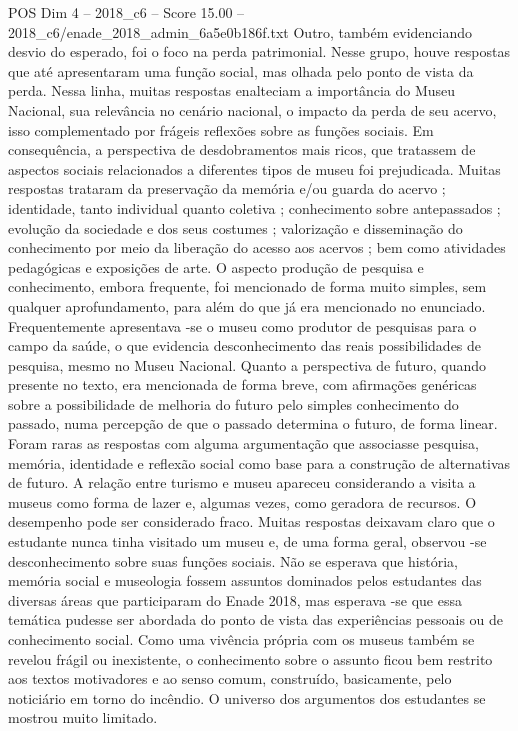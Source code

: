 \begin{textsample}{POS Dim 4 – 2018\_c6 – Score 15.00 – 2018\_c6/enade\_2018\_admin\_6a5e0b186f.txt}
Outro, também evidenciando desvio do esperado, foi o foco na perda patrimonial.
Nesse grupo, houve respostas que até apresentaram uma função social, mas olhada pelo ponto de vista da perda.
Nessa linha, muitas respostas enalteciam a importância do Museu Nacional, sua relevância no cenário nacional, o impacto da perda de seu acervo, isso complementado por frágeis reflexões sobre as funções sociais.
Em consequência, a perspectiva de desdobramentos mais ricos, que tratassem de aspectos sociais relacionados a diferentes tipos de museu foi prejudicada.
Muitas respostas trataram da preservação da memória e/ou guarda do acervo ; identidade, tanto individual quanto coletiva ; conhecimento sobre antepassados ; evolução da sociedade e dos seus costumes ; valorização e disseminação do conhecimento por meio da liberação do acesso aos acervos ; bem como atividades pedagógicas e exposições de arte.
O aspecto produção de pesquisa e conhecimento, embora frequente, foi mencionado de forma muito simples, sem qualquer aprofundamento, para além do que já era mencionado no enunciado.
Frequentemente apresentava -se o museu como produtor de pesquisas para o campo da saúde, o que evidencia desconhecimento das reais possibilidades de pesquisa, mesmo no Museu Nacional.
Quanto a perspectiva de futuro, quando presente no texto, era mencionada de forma breve, com afirmações genéricas sobre a possibilidade de melhoria do futuro pelo simples conhecimento do passado, numa percepção de que o passado determina o futuro, de forma linear.
Foram raras as respostas com alguma argumentação que associasse pesquisa, memória, identidade e reflexão social como base para a construção de alternativas de futuro.
A relação entre turismo e museu apareceu considerando a visita a museus como forma de lazer e, algumas vezes, como geradora de recursos.
O desempenho pode ser considerado fraco.
Muitas respostas deixavam claro que o estudante nunca tinha visitado um museu e, de uma forma geral, observou -se desconhecimento sobre suas funções sociais.
Não se esperava que história, memória social e museologia fossem assuntos dominados pelos estudantes das diversas áreas que participaram do Enade 2018, mas esperava -se que essa temática pudesse ser abordada do ponto de vista das experiências pessoais ou de conhecimento social.
Como uma vivência própria com os museus também se revelou frágil ou inexistente, o conhecimento sobre o assunto ficou bem restrito aos textos motivadores e ao senso comum, construído, basicamente, pelo noticiário em torno do incêndio.
O universo dos argumentos dos estudantes se mostrou muito limitado.

\end{textsample}
